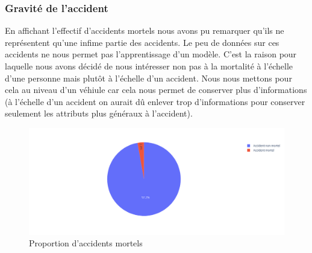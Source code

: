 \documentclass[]{article}
\begin{document}
    \subsubsection{Gravité de l'accident}
    En affichant l'effectif d'accidents mortels nous avons pu remarquer qu'ils ne représentent qu'une 
    infime partie des accidents. Le peu de données sur ces accidents ne nous permet pas l'apprentissage 
    d'un modèle. C'est la raison pour laquelle nous avons décidé de nous intéresser non pas à la mortalité 
    à l'échelle d'une personne mais plutôt à l'échelle d'un accident. Nous nous mettons pour cela au niveau d'un 
    véhiule car cela nous permet de conserver plus d'informations (à l'échelle d'un accident on aurait 
    dû enlever trop d'informations pour conserver seulement les attributs plus généraux à l'accident).

    \begin{figure}[ht]
        \centering
        \includegraphics[width=12cm]{./img/grav1.png}
        \caption{Proportion d'accidents mortels}
    \end{figure}
\end{document}
